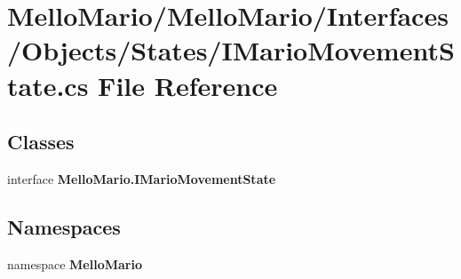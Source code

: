 \section{Mello\+Mario/\+Mello\+Mario/\+Interfaces/\+Objects/\+States/\+I\+Mario\+Movement\+State.cs File Reference}
\label{IMarioMovementState_8cs}
\subsection*{Classes}
\begin{DoxyCompactItemize}
\item 
interface \textbf{ Mello\+Mario.\+I\+Mario\+Movement\+State}
\end{DoxyCompactItemize}
\subsection*{Namespaces}
\begin{DoxyCompactItemize}
\item 
namespace \textbf{ Mello\+Mario}
\end{DoxyCompactItemize}
